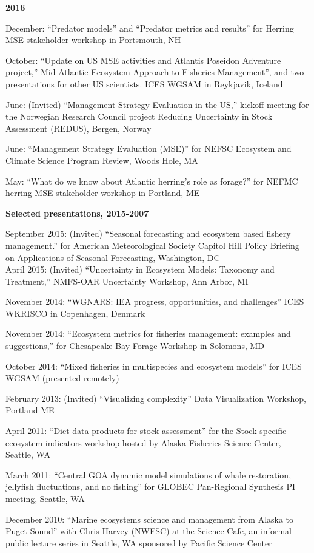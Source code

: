 \documentclass[11pt, a4paper]{awesome-cv}
\begin{document}
\textbf{2016}

December: ``Predator models'' and ``Predator metrics and results'' for
Herring MSE stakeholder workshop in Portsmouth, NH

October: ``Update on US MSE activities and Atlantis Poseidon Adventure
project,'' Mid-Atlantic Ecosystem Approach to Fisheries Management'',
and two presentations for other US scientists. ICES WGSAM in Reykjavik,
Iceland

June: (Invited) ``Management Strategy Evaluation in the US,'' kickoff
meeting for the Norwegian Research Council project Reducing Uncertainty
in Stock Assessment (REDUS), Bergen, Norway

June: ``Management Strategy Evaluation (MSE)'' for NEFSC Ecosystem and
Climate Science Program Review, Woods Hole, MA

May: ``What do we know about Atlantic herring's role as forage?'' for
NEFMC herring MSE stakeholder workshop in Portland, ME

\textbf{Selected presentations, 2015-2007}

September 2015: (Invited) ``Seasonal forecasting and ecosystem based
fishery management.'' for American Meteorological Society Capitol Hill
Policy Briefing on Applications of Seasonal Forecasting, Washington,
DC\\
April 2015: (Invited) ``Uncertainty in Ecosystem Models: Taxonomy and
Treatment,'' NMFS-OAR Uncertainty Workshop, Ann Arbor, MI

November 2014: ``WGNARS: IEA progress, opportunities, and challenges''
ICES WKRISCO in Copenhagen, Denmark

November 2014: ``Ecosystem metrics for fisheries management: examples
and suggestions,'' for Chesapeake Bay Forage Workshop in Solomons, MD

October 2014: ``Mixed fisheries in multispecies and ecosystem models''
for ICES WGSAM (presented remotely)

February 2013: (Invited) ``Visualizing complexity'' Data Visualization
Workshop, Portland ME

April 2011: ``Diet data products for stock assessment'' for the
Stock-specific ecosystem indicators workshop hosted by Alaska Fisheries
Science Center, Seattle, WA

March 2011: ``Central GOA dynamic model simulations of whale
restoration, jellyfish fluctuations, and no fishing'' for GLOBEC
Pan-Regional Synthesis PI meeting, Seattle, WA

December 2010: ``Marine ecosystems science and management from Alaska to
Puget Sound'' with Chris Harvey (NWFSC) at the Science Cafe, an informal
public lecture series in Seattle, WA sponsored by Pacific Science Center
\end{document}
